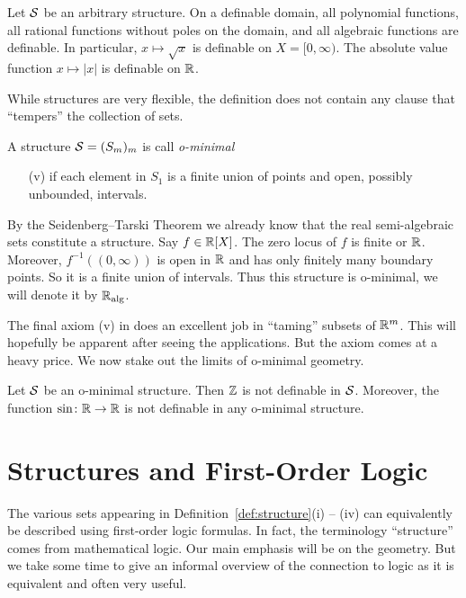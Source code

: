 \begin{example}
  Let ${\mathcal S}$ be an arbitrary structure. 
  On a definable domain, 
  all polynomial functions, all rational functions without poles on the
  domain, and all algebraic functions are definable.
  In particular, $x\mapsto \sqrt{x}$ is definable on $X=[0,\infty)$.
  The absolute value function $x\mapsto |x|$ is definable on ${\mathbb{R}}$.
\end{example}



While structures are very flexible, the definition does not contain
any clause that ``tempers'' the collection of sets.

\begin{definition}
  A {structure} ${\mathcal S}=(S_m)_m$ is call \emph{o-minimal}
  \begin{enumerate}
  \item [(v)]  if each 
  element in $S_1$ is a finite union of points and
  open, possibly unbounded, intervals.
  \end{enumerate}
\end{definition}

\begin{example}
  By the Seidenberg--Tarski Theorem we already know that the real
  semi-algebraic sets constitute a structure. Say $f\in{\mathbb{R}}[X]$.
  The zero locus of $f$ is finite or ${\mathbb{R}}$. Moreover,
  $f^{-1}((0,\infty))$ is open in ${\mathbb{R}}$ and has only finitely many
  boundary points. So it is a finite union of intervals. Thus this
  structure is o-minimal, we will denote it by ${\mathbb{R}}_{\mathrm{alg}}$. 
\end{example}

The final axiom (v) in does an excellent job in ``taming'' subsets of
${\mathbb{R}}^m$. This will hopefully be apparent after seeing the
applications. But the axiom comes at a heavy price.
We now stake out the limits of o-minimal geometry.

\begin{nonexample}
  Let ${\mathcal S}$ be an o-minimal structure. Then ${\mathbb{Z}}$ is not definable in
  ${\mathcal S}$. Moreover, the function $\sin \colon{\mathbb{R}}\rightarrow{\mathbb{R}}$
  is not definable in any o-minimal structure.  
\end{nonexample}

\section{Structures and First-Order Logic}

The various sets appearing in Definition~\ref{def:structure}(i) --
(iv) can equivalently be described using first-order logic formulas. In fact, the
terminology ``structure'' comes from mathematical logic. Our main
emphasis will be on the geometry.  But we  take some time to give
an informal overview of the connection to logic as it is equivalent
and often very useful. 


